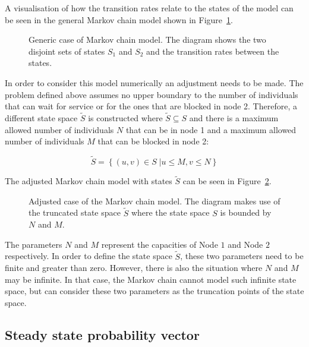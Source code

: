 A visualisation of how the transition rates relate to the states of the model
can be seen in the general Markov chain model shown in
Figure~\ref{fig:general_markov_model}.

\begin{figure}[H]
    \centering
    \scalebox{.8}
    {}
    \caption{Generic case of Markov chain model. The diagram shows the
    two disjoint sets of states \(S_1\) and \(S_2\) and the transition rates
    between the states.} 
    \label{fig:general_markov_model}
\end{figure}


In order to consider this model numerically an adjustment needs to be made.
The problem defined above assumes no upper boundary to the number of individuals
that can wait for service or for the ones that are blocked in node 2.
Therefore, a different state space \( \tilde S \) is constructed where
\( \tilde S \subseteq S \) and there is a maximum allowed number of individuals
\(N\) that can be in node 1 and a maximum allowed number of individuals
\(M\) that can be blocked in node 2:

\begin{equation}\label{eq:truncated_state_space}
    \tilde S = \left\{ (u, v) \in S\;| u \leq M, v\leq N \right\}
\end{equation}

The adjusted Markov chain model with states \(\tilde S\) can be seen in
Figure~\ref{fig:adjusted_markov_model}.

\begin{figure}[H]
    \centering
    \scalebox{.8}
    {}
    \caption{Adjusted case of the Markov chain model. The diagram makes use of
    the truncated state space \( \tilde S \) where the state space \(S\) is
    bounded by \(N\) and \(M\).}
    \label{fig:adjusted_markov_model}
\end{figure}

The parameters \(N\) and \(M\) represent the capacities of Node \(1\) and Node
\(2\) respectively.
In order to define the state space \( \tilde S \), these two parameters need to
be finite and greater than zero.
However, there is also the situation where \(N\) and \(M\) may be infinite.
In that case, the Markov chain cannot model such infinite state space, but
can consider these two parameters as the truncation points of the state space.

\subsection{Steady state probability vector}
\label{sec:steady_state_probabilities}

